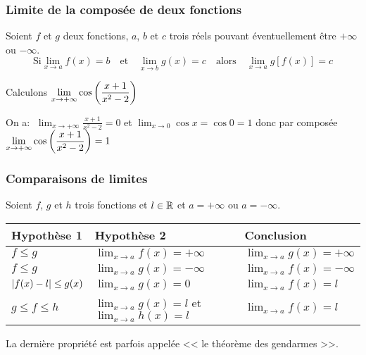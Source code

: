 \subsubsection*{Limite de la composée de deux fonctions}
\begin{property}
 Soient $f $  et $g$ deux fonctions, $a $, $b$  et  $c$ trois réels pouvant éventuellement être $ +\infty $ ou $ -\infty $. 
\[\text{Si}\displaystyle \lim_{x \to a} f(x) = b \quad \text{et} \quad \displaystyle \lim_{x \to b} g(x) = c \quad \text{alors} \quad \displaystyle \lim_{x \to a} g[f(x)] = c \]
  \end{property}
\begin{example}
 Calculons $\displaystyle \lim_{x \to +\infty} \cos\left(\frac{x+1}{x^{2}-2}\right)$ 
 
On a: $\; \displaystyle \lim_{x \to +\infty} \frac{x+1}{x^{2}-2} = 0 $ et $ \displaystyle \lim_{x \to 0} \cos x = \cos0=1 $ donc  par composée $  \displaystyle\lim_{x \to +\infty}\cos\left(\frac{x+1}{x^{2}-2}\right)=1 $

\end{example}  

 \subsubsection*{Comparaisons de limites}

Soient $f $, $g$ et $h$ trois fonctions et $ l\in\mathbb{R}$ et  $ a= +\infty $ ou $ a=-\infty $.

\medskip
\begin{tabularx}{\textwidth}{|X|X|X|}
\hline
\textbf{ Hypothèse 1}  & \textbf{Hypothèse 2} & \textbf{ Conclusion }\\
\hline
$ f\leq g $  & $ \displaystyle \lim_{x \to a}f(x)=+\infty $ & $\displaystyle \lim_{x \to a}g(x)=+\infty $ \\
 \hline
 $ f\leq g $  & $\displaystyle \lim_{x \to a}g(x)=-\infty $ & $ \displaystyle \lim_{x \to a}f(x)=-\infty $    \\
\hline
$ \left\lvert f(x)-l  \right\rvert\leq g(x) $ & $\displaystyle \lim_{x \to a}g(x)=0$ & $ \displaystyle \lim_{x \to a}f(x)=l  $ \\
\hline
$ g \leq f \leq h $ & $ \displaystyle \lim_{x \to a}g(x)=l $ et $ \displaystyle \lim_{x \to a}h(x)=l $ & $ \displaystyle \lim_{x \to a}f(x)=l $    \\
\hline
\end{tabularx}


\begin{remark}
La dernière propriété est parfois appelée << le théorème des gendarmes >>.
 \end{remark}

